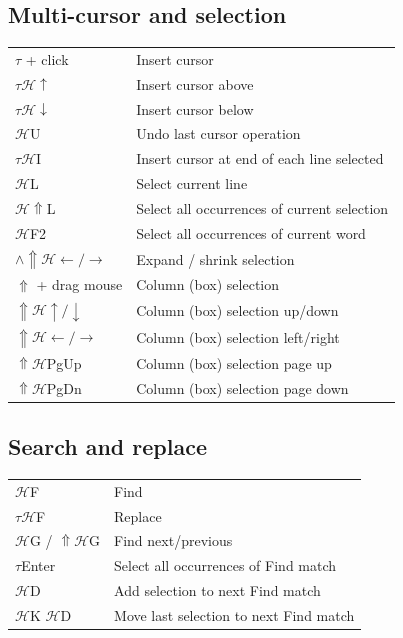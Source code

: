 \documentclass[UTF8]{article}
\begin{document}
\subsection*{Multi-cursor and selection}
\begin{tabular}{ll}
$\tau$ + click & Insert cursor \\
$\tau\mathscr{H}\uparrow$ & Insert cursor above \\
$\tau\mathscr{H}\downarrow$ & Insert cursor below \\
$\mathscr{H}$U & Undo last cursor operation \\
$\tau\mathscr{H}$I & Insert cursor at end of each line selected \\
$\mathscr{H}$L & Select current line \\
$\mathscr{H}\Uparrow$L & Select all occurrences of current selection \\
$\mathscr{H}$F2 & Select all occurrences of current word \\
$\wedge\Uparrow\mathscr{H}\leftarrow / \rightarrow$ & Expand / shrink selection \\
$\Uparrow$ + drag mouse & Column (box) selection \\
$\Uparrow\mathscr{H}\uparrow / \downarrow$ & Column (box) selection up/down \\
$\Uparrow\mathscr{H}\leftarrow / \rightarrow$ & Column (box) selection left/right \\
$\Uparrow\mathscr{H}$PgUp & Column (box) selection page up \\
$\Uparrow\mathscr{H}$PgDn & Column (box) selection page down \\
\end{tabular}

\subsection*{Search and replace}
\begin{tabular}{ll}
$\mathscr{H}$F & Find \\
$\tau\mathscr{H}$F & Replace \\
$\mathscr{H}$G / $\Uparrow\mathscr{H}$G & Find next/previous \\
$\tau$Enter & Select all occurrences of Find match \\
$\mathscr{H}$D & Add selection to next Find match \\
$\mathscr{H}$K $\mathscr{H}$D & Move last selection to next Find match \\
\end{tabular}
\end{document}
